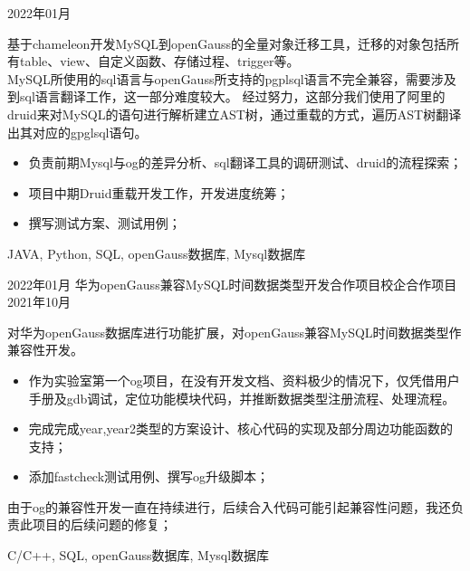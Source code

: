 \begin{experiences}
    {2022年01月} {
      基于chameleon开发MySQL到openGauss的全量对象迁移工具，迁移的对象包括所有table、view、自定义函数、存储过程、trigger等。 \\
      MySQL所使用的sql语言与openGauss所支持的pgplsql语言不完全兼容，需要涉及到sql语言翻译工作，这一部分难度较大。
      经过努力，这部分我们使用了阿里的druid来对MySQL的语句进行解析建立AST树，通过重载的方式，遍历AST树翻译出其对应的gpglsql语句。
      \begin{itemize}
        \item  负责前期Mysql与og的差异分析、sql翻译工具的调研测试、druid的流程探索；
        \item  项目中期Druid重载开发工作，开发进度统筹；
        \item  撰写测试方案、测试用例；
      \end{itemize}
                }
                {JAVA, Python, SQL, openGauss数据库, Mysql数据库}
	
  \emptySeparator
  \experience
  {2022年01月} {华为openGauss兼容MySQL时间数据类型开发合作项目}{校企合作项目}{}
  {2021年10月} {
    对华为openGauss数据库进行功能扩展，对openGauss兼容MySQL时间数据类型作兼容性开发。
    \begin{itemize}
      \item  作为实验室第一个og项目，在没有开发文档、资料极少的情况下，仅凭借用户手册及gdb调试，定位功能模块代码，并推断数据类型注册流程、处理流程。
      \item  完成完成year,year2类型的方案设计、核心代码的实现及部分周边功能函数的支持；
      \item  添加fastcheck测试用例、撰写og升级脚本；
    \end{itemize}
    由于og的兼容性开发一直在持续进行，后续合入代码可能引起兼容性问题，我还负责此项目的后续问题的修复；
              }
              {C/C++, SQL, openGauss数据库, Mysql数据库}

  	


\end{experiences}

